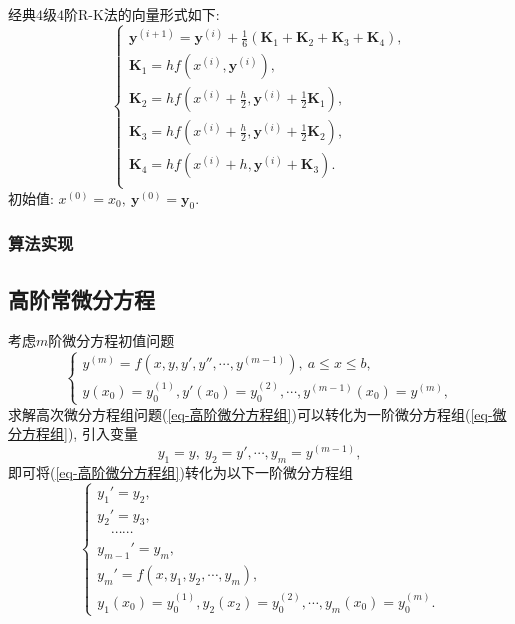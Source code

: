 \documentclass[12pt, a4paper, oneside]{ctexart}
\numberwithin{equation}{section}  %
\let\leq=\leqslant %
\def\bd{\boldsymbol}        %
\begin{document}
经典$4$级$4$阶R-K法的向量形式如下:
\begin{equation}
    \begin{cases}
        \bd{y}^{(i+1)} = \bd{y}^{(i)}+\frac{1}{6}(\bd{K}_1+\bd{K}_2+\bd{K}_3+\bd{K}_4),\\
        \bd{K}_1 = hf(x^{(i)}, \bd{y}^{(i)}),\\
        \bd{K}_2 = hf(x^{(i)}+\frac{h}{2}, \bd{y}^{(i)}+\frac{1}{2}\bd{K}_1),\\
        \bd{K}_3 = hf(x^{(i)}+\frac{h}{2}, \bd{y}^{(i)}+\frac{1}{2}\bd{K}_2),\\
        \bd{K}_4 = hf(x^{(i)}+h, \bd{y}^{(i)}+\bd{K}_3).\\
    \end{cases}
\end{equation}
初始值: $x^{(0)} = x_0,\ \bd{y}^{(0)} = \bd{y}_0$.
\subsubsection{算法实现}
\subsection{高阶常微分方程}
考虑$m$阶微分方程初值问题
\begin{equation}\label{eq-高阶微分方程组}
    \begin{cases}
        y^{(m)} = f(x, y, y', y'', \cdots, y^{(m-1)}),\ a\leq x\leq b,\\
        y(x_0) = y_0^{(1)}, y'(x_0) = y_0^{(2)},\cdots,y^{(m-1)}(x_0) = y^{(m)},
    \end{cases}
\end{equation}
求解高次微分方程组问题(\ref{eq-高阶微分方程组})可以转化为一阶微分方程组(\ref{eq-微分方程组}), 引入变量
\begin{equation}
    y_1 = y,\ y_2 = y', \cdots, y_m = y^{(m-1)},
\end{equation}
即可将(\ref{eq-高阶微分方程组})转化为以下一阶微分方程组
\begin{equation}
    \begin{cases}
        y_1' = y_2,\\
        y_2' = y_3,\\
        \quad\cdots\cdots\\
        y_{m-1}' = y_m,\\
        y_m' = f(x, y_1, y_2,\cdots, y_m),\\
        y_1(x_0) = y_0^{(1)},y_2(x_2) = y_0^{(2)},\cdots,y_m(x_0) = y_0^{(m)}.
    \end{cases}
\end{equation}
\end{document}
